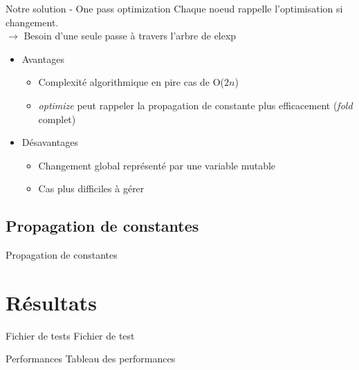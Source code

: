 \documentclass{beamer}
\begin{document}
\begin{frame}{Notre solution - One pass optimization}
  Chaque noeud rappelle l'optimisation si changement. \\
  $\rightarrow$ Besoin d'une seule passe à travers l'arbre de elexp
  \pause
  \begin{itemize}

    \item Avantages
      \begin{itemize}
        \item Complexité algorithmique en pire cas de O($2n$)
        \item \emph{optimize} peut rappeler la propagation de constante plus
          efficacement (\emph{fold} complet)
      \end{itemize}
  \pause
    \item Désavantages
      \begin{itemize}
        \item Changement global représenté par une variable mutable
        \item Cas plus difficiles à gérer
      \end{itemize}

  \end{itemize}
\end{frame}
\subsection{Propagation de constantes} 

\begin{frame}{Propagation de constantes}
\end{frame}

\section{Résultats}

\begin{frame}{Fichier de tests}
  Fichier de test
\end{frame}

\begin{frame}{Performances}
  Tableau des performances
\end{frame}
\end{document}
